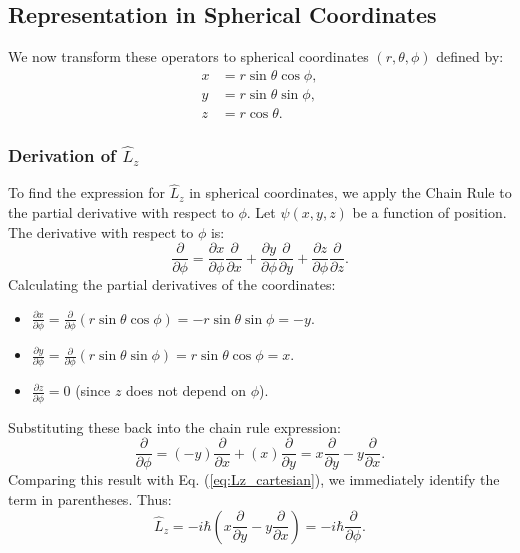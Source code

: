 \subsection{Representation in Spherical Coordinates}

We now transform these operators to spherical coordinates $(r, \theta, \phi)$ defined by:
\begin{align*}
    x &= r \sin\theta \cos\phi, \\
    y &= r \sin\theta \sin\phi, \\
    z &= r \cos\theta.
\end{align*}

\subsubsection{Derivation of $\hat{L}_z$}
To find the expression for $\hat{L}_z$ in spherical coordinates, we apply the Chain Rule to the partial derivative with respect to $\phi$. 
Let $\psi(x,y,z)$ be a function of position. The derivative with respect to $\phi$ is:
\begin{equation}
    \frac{\partial}{\partial \phi} = \frac{\partial x}{\partial \phi}\frac{\partial}{\partial x} + \frac{\partial y}{\partial \phi}\frac{\partial}{\partial y} + \frac{\partial z}{\partial \phi}\frac{\partial}{\partial z}.
\end{equation}
Calculating the partial derivatives of the coordinates:
\begin{itemize}
    \item $\frac{\partial x}{\partial \phi} = \frac{\partial}{\partial \phi}(r \sin\theta \cos\phi) = -r \sin\theta \sin\phi = -y$.
    \item $\frac{\partial y}{\partial \phi} = \frac{\partial}{\partial \phi}(r \sin\theta \sin\phi) = r \sin\theta \cos\phi = x$.
    \item $\frac{\partial z}{\partial \phi} = 0$ (since $z$ does not depend on $\phi$).
\end{itemize}
Substituting these back into the chain rule expression:
\begin{equation}
    \frac{\partial}{\partial \phi} = (-y)\frac{\partial}{\partial x} + (x)\frac{\partial}{\partial y} = x\frac{\partial}{\partial y} - y\frac{\partial}{\partial x}.
\end{equation}
Comparing this result with Eq. (\ref{eq:Lz_cartesian}), we immediately identify the term in parentheses. Thus:
\begin{equation}
    \hat{L}_z = -i\hbar \left( x \frac{\partial}{\partial y} - y \frac{\partial}{\partial x} \right) = -i\hbar \frac{\partial}{\partial \phi}.
\end{equation}

